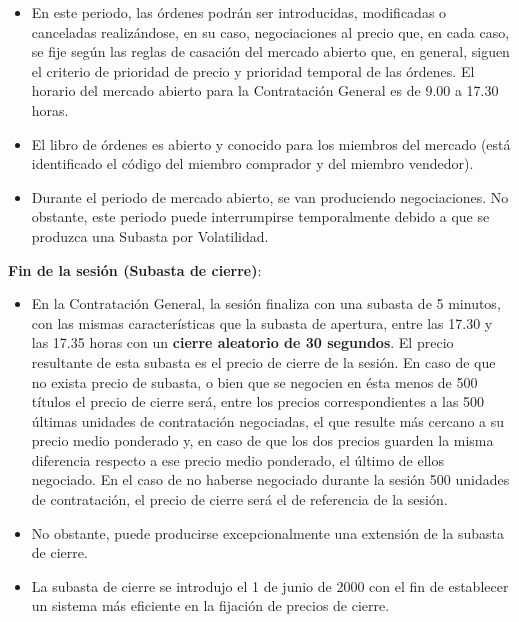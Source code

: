 \documentclass[
  letterpaper,
  DIV=11,
  numbers=noendperiod]{scrreprt}
\begin{document}
\begin{tcolorbox}[enhanced jigsaw, left=2mm, opacityback=0, colback=white, breakable, arc=.35mm, bottomrule=.15mm, rightrule=.15mm, toprule=.15mm, leftrule=.75mm, colframe=quarto-callout-tip-color-frame]
\begin{minipage}[t]{\textwidth - 5.5mm}
\begin{itemize}
\item
  En este periodo, las órdenes podrán ser introducidas, modificadas o
  canceladas realizándose, en su caso, negociaciones al precio que, en
  cada caso, se fije según las reglas de casación del mercado abierto
  que, en general, siguen el criterio de prioridad de precio y prioridad
  temporal de las órdenes. El horario del mercado abierto para la
  Contratación General es de 9.00 a 17.30 horas.
\item
  El libro de órdenes es abierto y conocido para los miembros del
  mercado (está identificado el código del miembro comprador y del
  miembro vendedor).
\item
  Durante el periodo de mercado abierto, se van produciendo
  negociaciones. No obstante, este periodo puede interrumpirse
  temporalmente debido a que se produzca una Subasta por Volatilidad.
\end{itemize}

\textbf{Fin de la sesión (Subasta de cierre)}:

\begin{itemize}
\item
  En la Contratación General, la sesión finaliza con una subasta de 5
  minutos, con las mismas características que la subasta de apertura,
  entre las 17.30 y las 17.35 horas con un \textbf{cierre aleatorio de
  30 segundos}. El precio resultante de esta subasta es el precio de
  cierre de la sesión. En caso de que no exista precio de subasta, o
  bien que se negocien en ésta menos de 500 títulos el precio de cierre
  será, entre los precios correspondientes a las 500 últimas unidades de
  contratación negociadas, el que resulte más cercano a su precio medio
  ponderado y, en caso de que los dos precios guarden la misma
  diferencia respecto a ese precio medio ponderado, el último de ellos
  negociado. En el caso de no haberse negociado durante la sesión 500
  unidades de contratación, el precio de cierre será el de referencia de
  la sesión.
\item
  No obstante, puede producirse excepcionalmente una extensión de la
  subasta de cierre.
\item
  La subasta de cierre se introdujo el 1 de junio de 2000 con el fin de
  establecer un sistema más eficiente en la fijación de precios de
  cierre.
\end{itemize}

\end{minipage}%
\end{tcolorbox}
\end{document}
